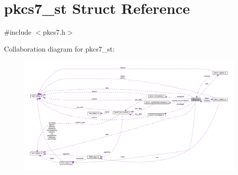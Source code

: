 \hypertarget{structpkcs7__st}{}\section{pkcs7\+\_\+st Struct Reference}
\label{structpkcs7__st}


{\ttfamily \#include $<$pkcs7.\+h$>$}



Collaboration diagram for pkcs7\+\_\+st\+:
\nopagebreak
\begin{figure}[H]
\begin{center}
\leavevmode
\includegraphics[width=350pt]{structpkcs7__st__coll__graph}
\end{center}
\end{figure}
